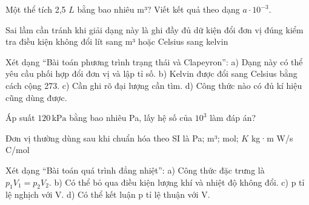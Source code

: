 \begin{ex}
Một thể tích 2,5 $L$ bằng bao nhiêu m³? Viết kết quả theo dạng $a\cdot10^{-3}$.
\end{ex}

\begin{ex}
Sai lầm cần tránh khi giải dạng này là
\choice
{ghi đầy đủ dữ kiện}
{đổi đơn vị đúng}
{kiểm tra điều kiện}
{\True không đổi lít sang m³ hoặc Celsius sang kelvin}
\end{ex}

\begin{ex}
Xét dạng “Bài toán phương trình trạng thái và Clapeyron”: a) Dạng này có thể yêu cầu phối hợp đổi đơn vị và lập tỉ số. b) Kelvin được đổi sang Celsius bằng cách cộng 273. c) Cần ghi rõ đại lượng cần tìm. d) Công thức nào có đủ kí hiệu cũng dùng được.
\choiceTF

\end{ex}

\begin{ex}
Áp suất $120\,\text{kPa}$ bằng bao nhiêu Pa, lấy hệ số của $10^3$ làm đáp án?
\end{ex}

\begin{ex}
Đơn vị thường dùng sau khi chuẩn hóa theo SI là
\choice
{\True Pa; m³; mol; $K$}
{kg·m}
{W/s}
{C/mol}
\end{ex}

\begin{ex}
Xét dạng “Bài toán quá trình đẳng nhiệt”: a) Công thức đặc trưng là $p_1V_1=p_2V_2$. b) Có thể bỏ qua điều kiện lượng khí và nhiệt độ không đổi. c) p tỉ lệ nghịch với V. d) Có thể kết luận p tỉ lệ thuận với V.
\choiceTF

\end{ex}

